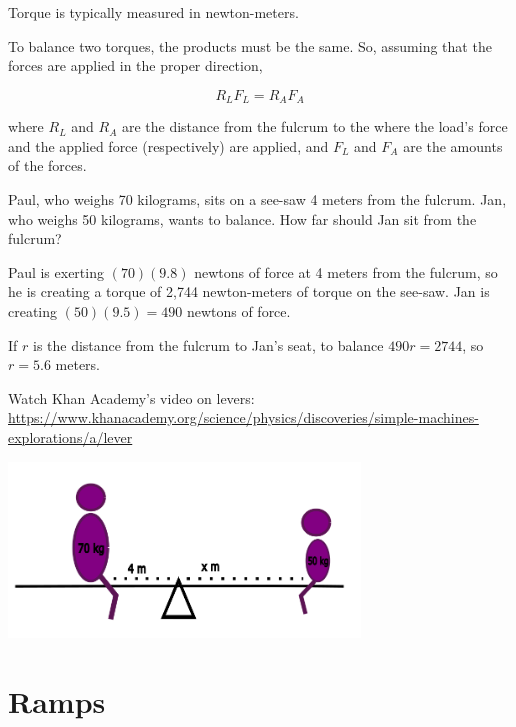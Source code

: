 Torque is typically measured in newton-meters.

To balance two torques, the products must be the same. So, assuming
that the forces are applied in the proper direction,

$$R_L F_L = R_A F_A$$

where $R_L$ and $R_A$ are the distance from the fulcrum to the where
the load's force and the applied force (respectively) are applied, and
$F_L$ and $F_A$ are the amounts of the forces.

\begin{Exercise}[title={Lever}, label=lever]
  
Paul, who weighs 70 kilograms, sits on a see-saw 4 meters from the
fulcrum. Jan, who weighs 50 kilograms, wants to balance. How far
should Jan sit from the fulcrum?

\end{Exercise}
\begin{Answer}[ref=lever]
  Paul is exerting $(70)(9.8)$ newtons of force at 4 meters from the
  fulcrum, so he is creating a torque of 2,744 newton-meters of torque
  on the see-saw.  Jan is creating $(50)(9.5) = 490$ newtons of
  force.

  If $r$ is the distance from the fulcrum to Jan's seat, to balance
  $490 r = 2744$, so $r = 5.6$ meters.
\end{Answer}

Watch Khan Academy's video on levers: \url{https://www.khanacademy.org/science/physics/discoveries/simple-machines-explorations/a/lever}

\includegraphics[width=0.7\textwidth]{fulcrum.png}

\section{Ramps}

